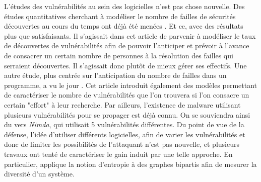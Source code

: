 L'études des vulnérabilités au sein des logicielles n'est pas chose nouvelle. Des études quantitatives cherchant à modéliser le
nombre de failles de sécurités découvertes au cours du temps ont déjà été menées \cite{vulnerabilityDiscovery}. Et ce, avec des
résultats plus que satisfaisants. Il s'agissait dans cet article de parvenir à modéliser le taux de découvertes de vulnérabilités
afin de pouvoir l'anticiper et prévoir à l'avance de consacrer un certain nombre de personnes à la résolution des failles qui
serraient découvertes. Il s'agissait donc plutôt de mieux gérer ses effectifs. Une autre étude, plus centrée sur l'anticipation du
nombre de failles dans un programme, a vu le jour \cite{assessingVulnerabilities}. Cet article introduit également des modèles
permettant de caractériser le nombre de vulnérabilités que l'on trouvera si l'on consacre un certain "effort" à leur recherche.
Par ailleurs, l'existence de malware utilisant plusieurs vulnérabilités pour se propager est déjà connu. On se souviendra ainsi du
vers \textit{Nimda}, qui utilisait 5 vulnérabilités différentes. Du point de vue de la défense, l'idée d'utiliser différents
logicielles, afin de varier les vulnérabilités et donc de limiter les possibilités de l'attaquant n'est pas nouvelle, et plusieurs
travaux ont tenté de caractériser le gain induit par une telle approche. En particulier, \cite{softwareDiversity:Security}
applique la notion d'entropie à des graphes bipartis afin de mesurer la diversité d'un système.
